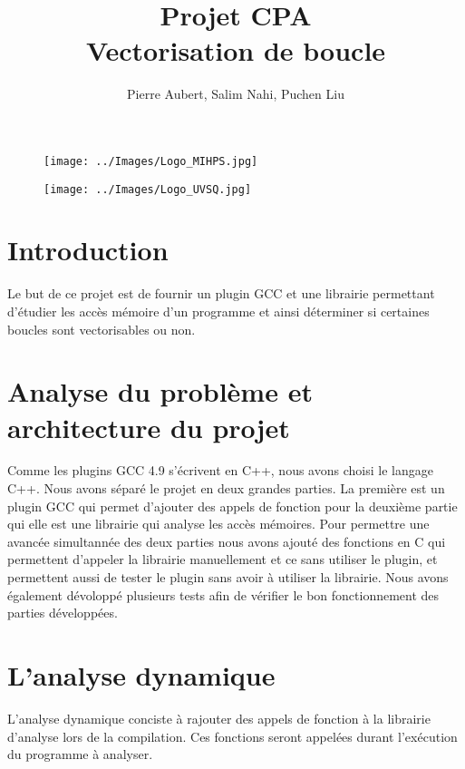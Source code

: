 \documentclass[12pt,french]{article}
\title{\color{blue}Projet CPA \\ Vectorisation de boucle}
\author{Pierre Aubert, Salim Nahi, Puchen Liu}
\begin{document}
\begin{figure}
	\begin{minipage}[b]{0.2\linewidth}
		\centering
		\texttt{[image: ../Images/Logo\_MIHPS.jpg]}
	\end{minipage}
	\hfill
	\begin{minipage}[b]{1.2\linewidth}
		\centering
		\texttt{[image: ../Images/Logo\_UVSQ.jpg]}
	\end{minipage}
\end{figure}

\maketitle

\section*{\color{blue}Introduction}

Le but de ce projet est de fournir un plugin GCC et une librairie permettant d'étudier les accès mémoire d'un programme et ainsi déterminer si certaines boucles sont vectorisables ou non.

\tableofcontents

\section{\color{blue}Analyse du problème et architecture du projet}

Comme les plugins GCC 4.9 s'écrivent en C++, nous avons choisi le langage C++. Nous avons séparé le projet en deux grandes parties. La première est un plugin GCC qui permet d'ajouter des appels de fonction pour la deuxième partie qui elle est une librairie qui analyse les accès mémoires. Pour permettre une avancée simultannée des deux parties nous avons ajouté des fonctions en C qui permettent d'appeler la librairie manuellement et ce sans utiliser le plugin, et permettent aussi de tester le plugin sans avoir à utiliser la librairie. Nous avons également dévoloppé plusieurs tests afin de vérifier le bon fonctionnement des parties développées.

\section{\color{blue}L'analyse dynamique}

L'analyse dynamique conciste à rajouter des appels de fonction à la librairie d'analyse lors de la compilation. Ces fonctions seront appelées durant l'exécution du programme à analyser. 
\end{document}
